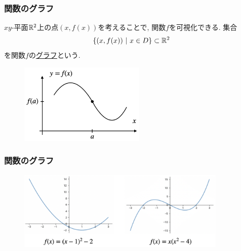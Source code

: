 

\begin{frame}
\frametitle{関数のグラフ}   

$xy$-平面$\mathbb{R}^2$上の点$(x,f(x))$を考えることで, 関数$f$を可視化できる. 
集合
$$
\{(x,f(x)) \ | \ x \in D\} \subset \mathbb{R}^2
$$
を関数$f$の\underline{グラフ}という. 

\begin{figure}[htbp]
 \begin{center} 
  \includegraphics[width=60mm]{calculus2/graph.png}
 \end{center}
\end{figure}


\end{frame}



\begin{frame}
\frametitle{関数のグラフ}   


\begin{figure}[htbp]
 \begin{center} 
  \includegraphics[width=100mm]{calculus2/graph2.png}
 \end{center}
\end{figure}


\end{frame}




